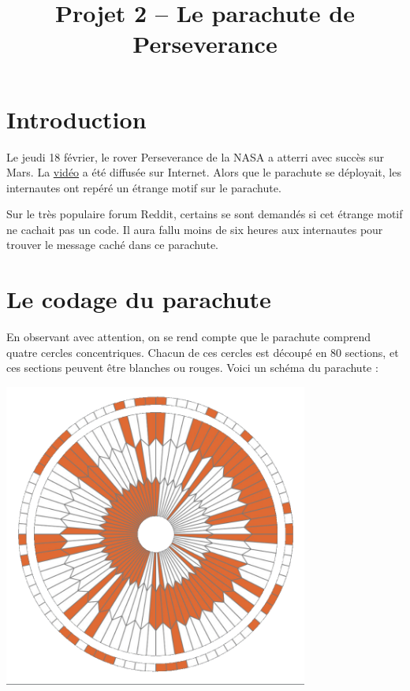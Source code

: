 \documentclass[a4paper,dvipsnames]{article}
\title{Projet 2 -- Le parachute de Perseverance}
\author{}
\date{}
\begin{document}
\renewcommand{\contentsname}{}

\pagestyle{fancy}

\begin{tcolorbox}[colframe=blue!75, colback=blue!45, valign=center, height=1.5cm, top=5mm]
  \maketitle
\end{tcolorbox}

\tableofcontents

\vspace{1cm}

\thispagestyle{fancy}

\section{Introduction}

Le jeudi 18 février, le rover Perseverance de la NASA a atterri avec succès sur Mars. La \href{https://peertube-lyclpg.ddns.net:9443/videos/watch/6db70ede-ff84-432e-8542-e6f335db75a1}{vidéo} a été diffusée sur Internet. Alors que le parachute se déployait, les internautes ont repéré un étrange motif sur le parachute.

\medskip

Sur le très populaire forum Reddit, certains se sont demandés si cet étrange motif ne cachait pas un code. Il aura fallu moins de six heures aux internautes pour trouver le message caché dans ce parachute. 

\section{Le codage du parachute}

En observant avec attention, on se rend compte que le parachute comprend quatre cercles concentriques. Chacun de ces cercles est découpé en 80 sections, et ces sections peuvent être blanches ou rouges. Voici un schéma du parachute :

\begin{center}
  \includegraphics[width=10cm]{img/motif.png}
\end{center}
\end{document}
